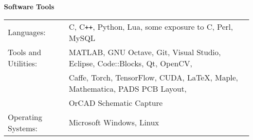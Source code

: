 \documentclass[10pt,letterpaper]{article}
\begin{document}
\bigskip
\noindent\textbf{\large{Software Tools}}

\medskip\noindent
\begin{tabular}{@{}lp{11cm}@{}}
\footnotesize{Languages:} & \footnotesize{C, C\texttt{++}, Python, Lua, some exposure to C\raisebox{2pt}{\texttt{\#}}, Perl, MySQL}\vspace{0.5mm}\\
\footnotesize{Tools and Utilities:} & \footnotesize{MATLAB, GNU Octave, Git, Visual Studio, Eclipse, Code::Blocks, Qt, OpenCV,}\\
                                    & \footnotesize{Caffe, Torch, TensorFlow, CUDA, \LaTeX, Maple, Mathematica, PADS PCB Layout,}\\
                                    & \footnotesize{OrCAD Schematic Capture}\vspace{0.5mm}\\
\footnotesize{Operating Systems:}   & \footnotesize{Microsoft Windows, Linux}\\
\end{tabular}
\end{document}
